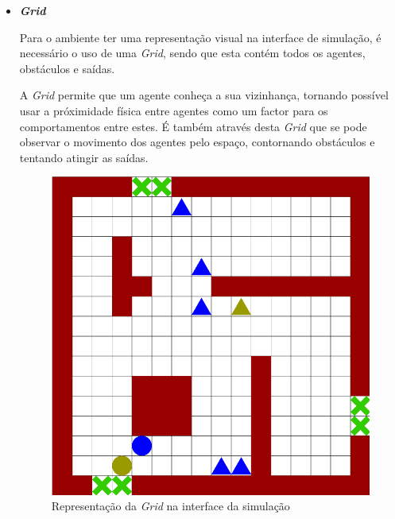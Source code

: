 \documentclass[12pt]{article}
\begin{document}
\begin{titlepage}
\begin{itemize}

\item \textbf{\textit{Grid}}

Para o ambiente ter uma representação visual na interface de simulação, é necessário o uso de uma \textit{Grid}, sendo que esta contém todos os agentes, obstáculos e saídas.

A \textit{Grid} permite que um agente conheça a sua vizinhança, tornando possível usar a próximidade física entre agentes como um factor para os comportamentos entre estes. É também através desta \textit{Grid} que se pode observar o movimento dos agentes pelo espaço, contornando obstáculos e tentando atingir as saídas.

\begin{figure}[H]
	\centering
	\includegraphics[scale=0.20]{map_simulation.png}
	\caption{Representação da \textit{Grid} na interface da simulação}
	\label{map}
\end{figure}


\end{itemize}
\end{titlepage}
\end{document}
